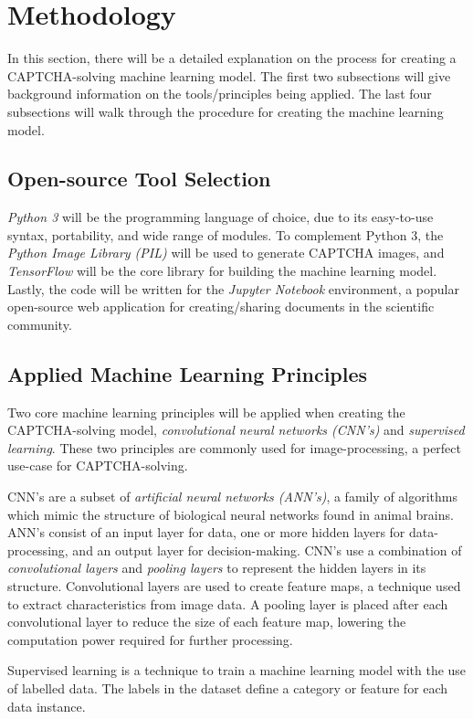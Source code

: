 \documentclass[11pt,conference]{IEEEtran}
\begin{document}
\section{Methodology}

In this section, there will be a detailed explanation on the process for
creating a CAPTCHA-solving machine learning model. The first two subsections
will give background information on the tools/principles being applied. The
last four subsections will walk through the procedure for creating the machine
learning model.

\subsection{Open-source Tool Selection}
\emph{Python 3} will be the programming language of choice, due to its
easy-to-use syntax, portability, and wide range of modules. To complement
Python 3, the \emph{Python Image Library (PIL)} will be used to generate
CAPTCHA images, and \emph{TensorFlow} will be the core library for building the
machine learning model. Lastly, the code will be written for the \emph{Jupyter
Notebook} environment, a popular open-source web application for creating/sharing
documents in the scientific community.

\subsection{Applied Machine Learning Principles}
Two core machine learning principles will be applied when creating the
CAPTCHA-solving model, \emph{convolutional neural networks (CNN's)} and
\emph{supervised learning}. These two principles are commonly used for
image-processing, a perfect use-case for CAPTCHA-solving.

CNN's are a subset of \emph{artificial neural networks (ANN's)}, a family of algorithms
which mimic the structure of biological neural networks found in animal brains.
ANN's consist of an input layer for data, one or more hidden layers for
data-processing, and an output layer for decision-making. CNN's use
a combination of \emph{convolutional layers} and \emph{pooling layers} to
represent the hidden layers in its structure. Convolutional layers are used to
create feature maps, a technique used to extract characteristics from image
data. A pooling layer is placed after each convolutional layer to reduce the
size of each feature map, lowering the computation power required for
further processing.

Supervised learning is a technique to train a machine learning model with
the use of labelled data. The labels in the dataset define a category or
feature for each data instance.
\end{document}
